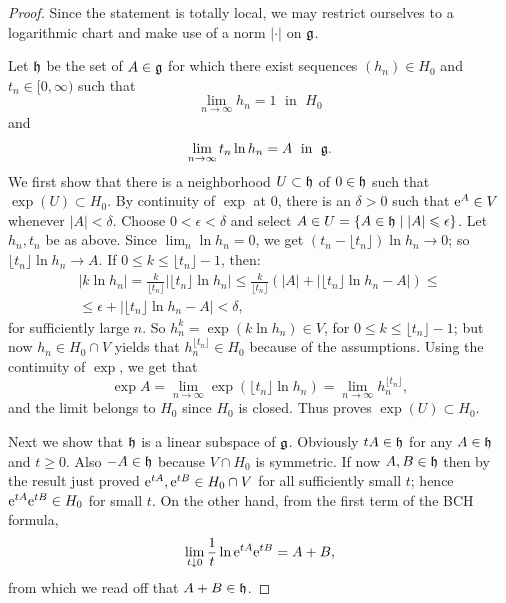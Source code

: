 \begin{proof}
    Since the statement is totally local, we may restrict ourselves to a logarithmic chart and make use of a norm $|\cdot |$ on $\mathfrak{g}$.

    Let $\mathfrak{h}$ be the set of $A\in\mathfrak{g}$ for which there exist sequences $(h_n)\in H_0$ and $t_n\in[0,\infty)$ such that 
    \[\lim_{n\to\infty} h_n=1\;\text{ in }\;H_0\] and 
    \[\lim_{n\to\infty} t_n \ln h_n=A\;\text{ in }\;\mathfrak{g}.\]
    We first show that there is a neighborhood $U\subset \mathfrak{h}$ of $0\in\mathfrak{h}$ such that $\exp(U)\subset H_0$. By continuity of $\exp$ at $0$, there is an $\delta>0$ such that $\mathrm{e}^A\in V$ whenever $|A|<\delta$. Choose $0<\epsilon<\delta$ and select $A\in U=\{A\in\mathfrak{h}\mid |A|\leqslant \epsilon\}$. Let $h_n,t_n$ be as above. Since $\lim_n \ln h_n=0$, we get $(t_n-\lfloor t_n\rfloor)\ln h_n\to 0$; so $\lfloor t_n\rfloor \ln h_n\to A$. If $0\leq k\leq \lfloor t_n\rfloor -1$, then:
    \begin{multline}
        |k\ln h_n|=\frac{k}{\lfloor t_n\rfloor}|\lfloor t_n\rfloor \ln h_n|\leq 
    \frac{k}{\lfloor t_n\rfloor}(|A|+|\lfloor t_n\rfloor \ln h_n-A|)\leq \\
    \leq \epsilon+|\lfloor t_n\rfloor \ln h_n-A|<\delta,
    \end{multline}
    for sufficiently large $n$. So $h_n^k=\exp(k\ln h_n)\in V$, for $0\leq k\leq \lfloor t_n\rfloor -1$; but now $h_n\in H_0\cap V$ yields that $h_n^{\lfloor t_n\rfloor}\in H_0$ because of the assumptions. Using the continuity of $\exp$, we get that
    \[\exp A=\lim_{n\to \infty}\exp\left(\lfloor t_n\rfloor \ln h_n\right)=\lim_{n\to\infty} h_n^{\lfloor t_n\rfloor},\]
    and the limit belongs to $H_0$ since $H_0$ is closed. Thus proves $\exp(U)\subset H_0$.

    Next we show that $\mathfrak{h}$ is a linear subspace of $\mathfrak{g}$. Obviously $tA\in\mathfrak{h}$ for any $A\in\mathfrak{h}$ and $t\geq 0$. Also $-A\in\mathfrak{h}$ because $V\cap H_0$ is symmetric. If now $A,B\in\mathfrak{h}$ then by the result just proved $\mathrm{e}^{tA},\mathrm{e}^{tB}\in H_0\cap V$ for all sufficiently small $t$; hence $\mathrm{e}^{tA}\mathrm{e}^{tB}\in H_0$ for small $t$. On the other hand, from the first term of the BCH formula,
    \[\lim_{t\downarrow 0}\frac{1}{t} \ln \mathrm{e}^{tA}\mathrm{e}^{tB}=A+B,\]
    from which we read off that $A+B\in\mathfrak{h}$.


\end{proof}
